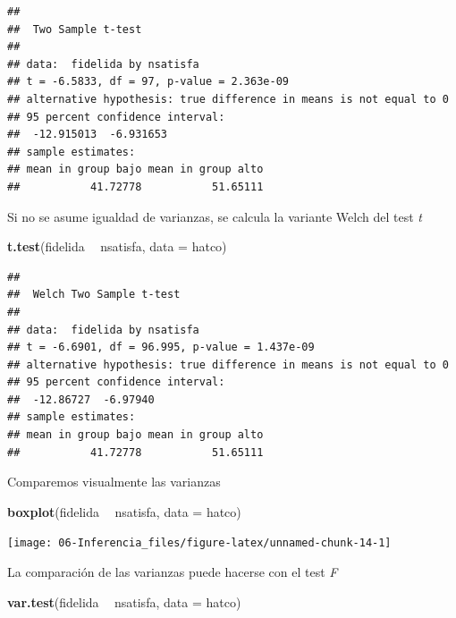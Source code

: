\documentclass[]{book}
\newenvironment{Shaded}{\begin{snugshade}}{\end{snugshade}}
\newcommand{\KeywordTok}[1]{\textcolor[rgb]{0.13,0.29,0.53}{\textbf{#1}}}
\newcommand{\DataTypeTok}[1]{\textcolor[rgb]{0.13,0.29,0.53}{#1}}
\newcommand{\StringTok}[1]{\textcolor[rgb]{0.31,0.60,0.02}{#1}}
\newcommand{\OperatorTok}[1]{\textcolor[rgb]{0.81,0.36,0.00}{\textbf{#1}}}
\newcommand{\NormalTok}[1]{#1}
\begin{document}
\begin{verbatim}
## 
##  Two Sample t-test
## 
## data:  fidelida by nsatisfa
## t = -6.5833, df = 97, p-value = 2.363e-09
## alternative hypothesis: true difference in means is not equal to 0
## 95 percent confidence interval:
##  -12.915013  -6.931653
## sample estimates:
## mean in group bajo mean in group alto 
##           41.72778           51.65111
\end{verbatim}

Si no se asume igualdad de varianzas, se calcula la variante Welch del
test \emph{t}

\begin{Shaded}
\begin{Highlighting}[]
\KeywordTok{t.test}\NormalTok{(fidelida }\OperatorTok{~}\StringTok{ }\NormalTok{nsatisfa, }\DataTypeTok{data =}\NormalTok{ hatco)}
\end{Highlighting}
\end{Shaded}

\begin{verbatim}
## 
##  Welch Two Sample t-test
## 
## data:  fidelida by nsatisfa
## t = -6.6901, df = 96.995, p-value = 1.437e-09
## alternative hypothesis: true difference in means is not equal to 0
## 95 percent confidence interval:
##  -12.86727  -6.97940
## sample estimates:
## mean in group bajo mean in group alto 
##           41.72778           51.65111
\end{verbatim}

Comparemos visualmente las varianzas

\begin{Shaded}
\begin{Highlighting}[]
\KeywordTok{boxplot}\NormalTok{(fidelida }\OperatorTok{~}\StringTok{ }\NormalTok{nsatisfa, }\DataTypeTok{data =}\NormalTok{ hatco)}
\end{Highlighting}
\end{Shaded}

\begin{center}\texttt{[image: 06-Inferencia\_files/figure-latex/unnamed-chunk-14-1]} \end{center}

La comparación de las varianzas puede hacerse con el test \emph{F}

\begin{Shaded}
\begin{Highlighting}[]
\KeywordTok{var.test}\NormalTok{(fidelida }\OperatorTok{~}\StringTok{ }\NormalTok{nsatisfa, }\DataTypeTok{data =}\NormalTok{ hatco)}
\end{Highlighting}
\end{Shaded}
\end{document}
